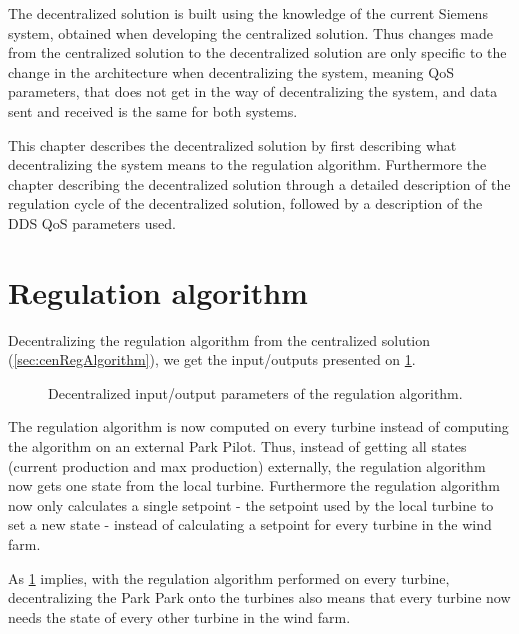\noindent The decentralized solution is built using the knowledge of the current Siemens system, obtained when developing the centralized solution. Thus changes made from the centralized solution to the decentralized solution are only specific to the change in the architecture when decentralizing the system, meaning QoS parameters, that does not get in the way of decentralizing the system, and data sent and received is the same for both systems.

This chapter describes the decentralized solution by first describing what decentralizing the system means to the regulation algorithm. Furthermore the chapter describing the decentralized solution through a detailed description of the regulation cycle of the decentralized solution, followed by a description of the DDS QoS parameters used. 

\section{Regulation algorithm}

Decentralizing the regulation algorithm from the centralized solution (\cref{sec:cenRegAlgorithm}), we get the input/outputs presented on \cref{fig:ioDecenRegAlg}.

\begin{figure}
	\centering
	

	\caption[Decentralized input/output parameters of the regulation algorithm]{
		\label{fig:ioDecenRegAlg} 
		\footnotesize{%
			Decentralized input/output parameters of the regulation algorithm.
		}
	}
\end{figure}

The regulation algorithm is now computed on every turbine instead of computing the algorithm on an external Park Pilot. Thus, instead of getting all states (current production and max production) externally, the regulation algorithm now gets one state from the local turbine. Furthermore the regulation algorithm now only calculates a single setpoint - the setpoint used by the local turbine to set a new state - instead of calculating a setpoint for every turbine in the wind farm.

As \cref{fig:ioDecenRegAlg} implies, with the regulation algorithm performed on every turbine, decentralizing the Park Park onto the turbines also means that every turbine now needs the state of every other turbine in the wind farm.



